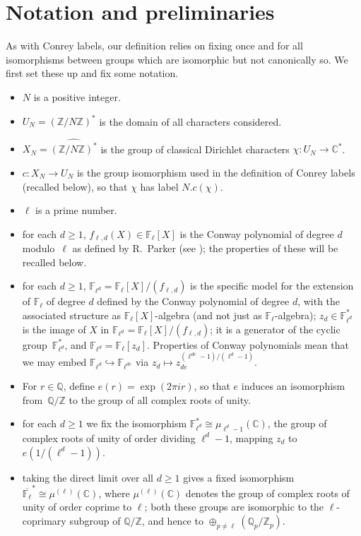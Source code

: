 \documentclass[a4paper, 10pt]{amsart}
\def\Z{{\mathbb Z}}
\def\Q{{\mathbb Q}}
\def\C{{\mathbb C}}
\def\F{{\mathbb F}}
\def\Fl{{\mathbb F}_{\ell}}
\def\Fld{{\mathbb F}_{\ell^d}}
\def\Flbar{\overline{{\mathbb F}_{\ell}}}
\def\ZNs{(\Z/N\Z)^*}
\def\ZNsh{\widehat{\ZNs}}
\newcommand{\CLab}[2]{$#1.#2$}
\begin{document}
\section{Notation and preliminaries}

As with Conrey labels, our definition relies on fixing once and for
all isomorphisms between groups which are isomorphic but not
canonically so.  We first set these up and fix some notation.

\begin{itemize}
\item $N$ is a positive integer.
\item $U_N=\ZNs$ is the domain of all characters considered.
\item $X_N=\ZNsh$ is the group of classical Dirichlet characters
  $\chi:U_N\to\C^*$.
\item $c:X_N\to U_N$ is the group isomorphism used in the
  definition of Conrey labels (recalled below), so that $\chi$ has
  label \CLab{N}{c(\chi)}.
\item $\ell$ is a prime number.
\item for each $d\ge1$, $f_{\ell,d}(X) \in \Fl[X]$ is the Conway
  polynomial of degree $d$ modulo~$\ell$ as defined by R.~Parker (see
  \cite{ConwayPol}); the properties of these will be recalled below.
\item for each $d\ge1$, $\Fld=\Fl[X]/(f_{\ell,d})$ is the specific
  model for the extension of $\Fl$ of degree $d$ defined by the Conway
  polynomial of degree $d$, with the associated structure as
  $\Fl[X]$-algebra (and not just as $\Fl$-algebra); $z_d\in\Fld^*$ is
  the image of $X$ in $\Fld=\Fl[X]/(f_{\ell,d})$; it is a generator of
  the cyclic group~$\Fld^*$, and $\Fld=\Fl[z_d]$.  Properties of
  Conway polynomials mean that we may embed
  $\Fld\hookrightarrow\F_{\ell^{de}}$ via $z_d\mapsto
  z_{de}^{(\ell^{de}-1)/(\ell^d-1)}$.
\item For $r\in\Q$, define $e(r)=\exp(2\pi ir)$, so that $e$ induces an
  isomorphism from~$\Q/\Z$ to the group of all complex roots of unity.
\item for each $d\ge1$ we fix the isomorphism
  $\Fld^*\cong\mu_{\ell^d-1}(\C)$, the group of complex roots of unity
  of order dividing $\ell^d-1$, mapping $z_d$ to $e(1/(\ell^d-1))$.
\item taking the direct limit over all $d\ge1$ gives a fixed
  isomorphism $\Flbar^*\cong\mu^{(\ell)}(\C)$, where
  $\mu^{(\ell)}(\C)$ denotes the group of complex roots of unity of
  order coprime to $\ell$; both these groups are isomorphic to the
  $\ell$-coprimary subgroup of $\Q/\Z$, and hence to
  $\oplus_{p\not=\ell}(\Q_p/\Z_p)$.
\end{itemize}
\end{document}
